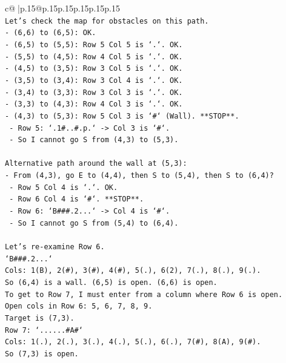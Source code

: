 \documentclass{article}
\begin{document}
{\begin{supertabular}{c@{$\;$}|p{.15\linewidth}@{}p{.15\linewidth}p{.15\linewidth}p{.15\linewidth}p{.15\linewidth}p{.15\linewidth}}
{{{\\ 
\texttt{Let's check the map for obstacles on this path.} \\
\texttt{{-} (6,6) to (6,5): OK.} \\
\texttt{{-} (6,5) to (5,5): Row 5 Col 5 is `.`. OK.} \\
\texttt{{-} (5,5) to (4,5): Row 4 Col 5 is `.`. OK.} \\
\texttt{{-} (4,5) to (3,5): Row 3 Col 5 is `.`. OK.} \\
\texttt{{-} (3,5) to (3,4): Row 3 Col 4 is `.`. OK.} \\
\texttt{{-} (3,4) to (3,3): Row 3 Col 3 is `.`. OK.} \\
\texttt{{-} (3,3) to (4,3): Row 4 Col 3 is `.`. OK.} \\
\texttt{{-} (4,3) to (5,3): Row 5 Col 3 is `\#` (Wall). **STOP**.} \\
\texttt{  {-} Row 5: `.1\#..\#.p.` {-}> Col 3 is `\#`.} \\
\texttt{  {-} So I cannot go S from (4,3) to (5,3).} \\
\\ 
\texttt{Alternative path around the wall at (5,3):} \\
\texttt{{-} From (4,3), go E to (4,4), then S to (5,4), then S to (6,4)?} \\
\texttt{  {-} Row 5 Col 4 is `.`. OK.} \\
\texttt{  {-} Row 6 Col 4 is `\#`. **STOP**.} \\
\texttt{  {-} Row 6: `B\#\#\#.2...` {-}> Col 4 is `\#`.} \\
\texttt{  {-} So I cannot go S from (5,4) to (6,4).} \\
\\ 
\texttt{Let's re{-}examine Row 6.} \\
\texttt{`B\#\#\#.2...`} \\
\texttt{Cols: 1(B), 2(\#), 3(\#), 4(\#), 5(.), 6(2), 7(.), 8(.), 9(.).} \\
\texttt{So (6,4) is a wall. (6,5) is open. (6,6) is open.} \\
\texttt{To get to Row 7, I must enter from a column where Row 6 is open.} \\
\texttt{Open cols in Row 6: 5, 6, 7, 8, 9.} \\
\texttt{Target is (7,3).} \\
\texttt{Row 7: `......\#A\#`} \\
\texttt{Cols: 1(.), 2(.), 3(.), 4(.), 5(.), 6(.), 7(\#), 8(A), 9(\#).} \\
\texttt{So (7,3) is open.} \\
}}}
\end{supertabular}}
\end{document}
